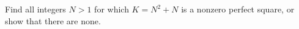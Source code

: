 Find all integers $N>1$ for which $K=N^2+N$ is a nonzero perfect square, or show that there are none.
